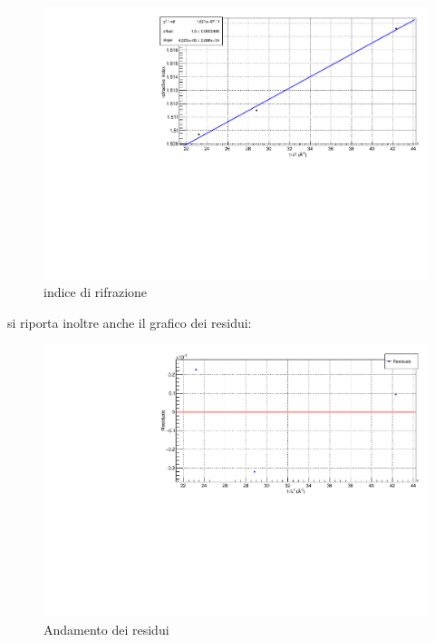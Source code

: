 \documentclass{article}
\begin{document}
\begin{center}
	\begin{figure}[ht]
		\centering
		\includegraphics[scale=0.38, angle=0]{nFit.pdf}
        \setlength{\belowcaptionskip}{-20pt}
		\caption{ indice di rifrazione}
		\label{fig:nFit}
	\end{figure}
\end{center}

si riporta inoltre anche il grafico dei residui:
\begin{center}
	\begin{figure}[ht]
		\centering
		\includegraphics[scale=0.38, angle=0]{nFitRes.pdf}
        \setlength{\belowcaptionskip}{-20pt}
		\caption{ Andamento dei residui}
		\label{fig:nFitRes}
	\end{figure}
\end{center}
\end{document}
